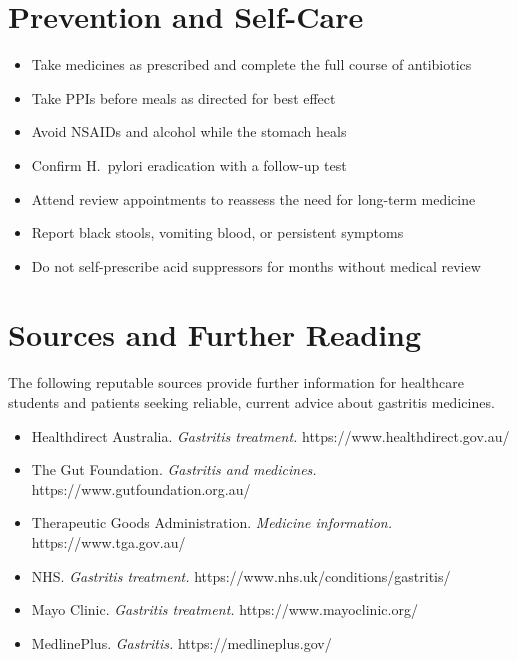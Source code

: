 \section*{Prevention and Self-Care}
\begin{itemize}
    \item Take medicines as prescribed and complete the full course of antibiotics
    \item Take PPIs before meals as directed for best effect
    \item Avoid NSAIDs and alcohol while the stomach heals
    \item Confirm H.\ pylori eradication with a follow-up test
    \item Attend review appointments to reassess the need for long-term medicine
    \item Report black stools, vomiting blood, or persistent symptoms
    \item Do not self-prescribe acid suppressors for months without medical review
\end{itemize}

\section*{Sources and Further Reading}
The following reputable sources provide further information for healthcare students and patients seeking reliable, current advice about gastritis medicines.
\begin{itemize}
    \item Healthdirect Australia. \textit{Gastritis treatment.} https://www.healthdirect.gov.au/
    \item The Gut Foundation. \textit{Gastritis and medicines.} https://www.gutfoundation.org.au/
    \item Therapeutic Goods Administration. \textit{Medicine information.} https://www.tga.gov.au/
    \item NHS. \textit{Gastritis treatment.} https://www.nhs.uk/conditions/gastritis/
    \item Mayo Clinic. \textit{Gastritis treatment.} https://www.mayoclinic.org/
    \item MedlinePlus. \textit{Gastritis.} https://medlineplus.gov/
\end{itemize}
